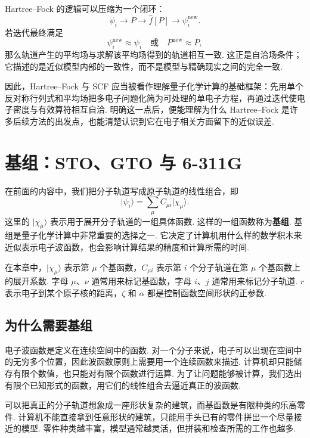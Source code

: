 \documentclass[UTF8,11pt,a4paper,openany]{ctexbook}
\newcommand{\ket}[1]{\lvert #1\rangle}\newcommand{\bra}[1]{\langle #1\rvert}
\newcommand{\term}[1]{\textbf{#1}}
\begin{document}
\begin{derivationbox}
Hartree--Fock 的逻辑可以压缩为一个闭环：
\[
\psi_i
\longrightarrow
P
\longrightarrow
\hat f[P]
\longrightarrow
\psi_i^{\mathrm{new}}.
\]
若迭代最终满足
\[
\psi_i^{\mathrm{new}}\approx\psi_i
\quad\text{或}\quad
P^{\mathrm{new}}\approx P,
\]
那么轨道产生的平均场与求解该平均场得到的轨道相互一致. 这正是自洽场条件；它描述的是近似模型内部的一致性，而不是模型与精确现实之间的完全一致. 
\end{derivationbox}

因此，Hartree--Fock 与 SCF 应当被看作理解量子化学计算的基础框架：先用单个反对称行列式和平均场把多电子问题化简为可处理的单电子方程，再通过迭代使电子密度与有效算符相互自洽. 明确这一点后，便能理解为什么 Hartree--Fock 是许多后续方法的出发点，也能清楚认识到它在电子相关方面留下的近似误差. 
\chapter{基组：STO、GTO 与 6-311G}

在前面的内容中，我们把分子轨道写成原子轨道的线性组合，即
\[
\ket{\psi_i}=\sum_{\mu}C_{\mu i}\ket{\chi_\mu}.
\]
这里的 $\ket{\chi_\mu}$ 表示用于展开分子轨道的一组具体函数. 这样的一组函数称为\term{基组}. 基组是量子化学计算中非常重要的选择之一. 它决定了计算机用什么样的数学积木来近似表示电子波函数，也会影响计算结果的精度和计算所需的时间. 

\begin{notationbox}
在本章中，$\ket{\chi_\mu}$ 表示第 $\mu$ 个基函数，$C_{\mu i}$ 表示第 $i$ 个分子轨道在第 $\mu$ 个基函数上的展开系数. 字母 $\mu$、$\nu$ 通常用来标记基函数，字母 $i$、$j$ 通常用来标记分子轨道. $r$ 表示电子到某个原子核的距离，$\zeta$ 和 $\alpha$ 都是控制函数空间形状的正参数. 
\end{notationbox}

\section{为什么需要基组}

电子波函数是定义在连续空间中的函数. 对一个分子来说，电子可以出现在空间中的无穷多个位置，因此波函数原则上需要用一个连续函数来描述. 计算机却只能储存有限个数值，也只能对有限个函数进行运算. 为了让问题能够被计算，我们选出有限个已知形式的函数，用它们的线性组合去逼近真正的波函数. 

\begin{analogybox}
可以把真正的分子轨道想象成一座形状复杂的建筑，而基函数是有限种类的乐高零件. 计算机不能直接拿到任意形状的建筑，只能用手头已有的零件拼出一个尽量接近的模型. 零件种类越丰富，模型通常越灵活，但拼装和检查所需的工作也越多. 
\end{analogybox}
\end{document}
